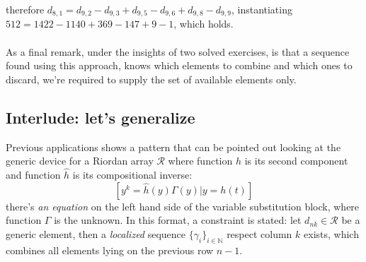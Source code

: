 therefore $d_{8,1}=d_{9,2} - d_{9,3} + d_{9,5}- d_{9,6}+ d_{9,8}- d_{9,9}$, 
instantiating $512 = 1422 -1140 +369 -147 +9 -1$, which holds.
\\\\
As a final remark, under the insights of two solved exercises, is that a
sequence found using this approach, knows which elements to combine and which
ones to discard, we're required to supply the set of available elements only.


\subsection{Interlude: let's generalize}

Previous applications shows a pattern that can be pointed out looking at 
the generic device for a Riordan array $\mathcal{R}$ where 
function $h$ is its second component and function $\hat{h}$ 
is its compositional inverse:
\begin{displaymath}
    \left[y^{k} = \hat{h}(y) \Gamma(y) \big| y = h(t) \right]
\end{displaymath}
there's \emph{an equation} on the left hand side of the variable substitution block, 
where function $\Gamma$ is the unknown. In this format, 
a constraint is stated: let $d_{nk}\in\mathcal{R}$ be a generic element, 
then a \emph{localized} sequence 
$\lbrace \gamma_{i} \rbrace_{i\in\mathbb{N}}$ respect column $k$ exists, which
combines all elements lying on the previous row $n-1$.

